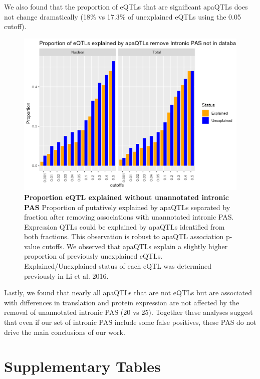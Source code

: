 We also found that the proportion of eQTLs that are significant apaQTLs does not change dramatically (18\% vs 17.3\% of unexplained eQTLs using the 0.05 cutoff).

\begin{figure}
\centering \includegraphics[width=5in]{img/ch02/figureAppendix9.png}
\caption[Proportion eQTL explained without unannotated intronic PAS]{\textbf{Proportion eQTL explained without unannotated intronic PAS} Proportion of putatively explained by apaQTLs separated by fraction after removing associations with unannotated intronic PAS. Expression QTLs could be explained by apaQTLs identified from both fractions. This observation is robust to apaQTL association p-value cutoffs. We observed that apaQTLs explain a slightly higher proportion of previously unexplained eQTLs. Explained/Unexplained status of each eQTL was determined previously in Li et al. 2016.\citep{li_rna_2016}}
\label{fig:Supplementaryfile1-Fig9}
\end{figure} 

Lastly, we found that nearly all apaQTLs that are not eQTLs but are associated with differences in translation and protein expression are not affected by the removal of unannotated intronic PAS (20 vs 25). Together these analyses suggest that even if our set of intronic PAS include some false positives, these PAS do not drive the main conclusions of our work.  



\clearpage
\section{Supplementary Tables}\label{ch02-supplementary-tables}

